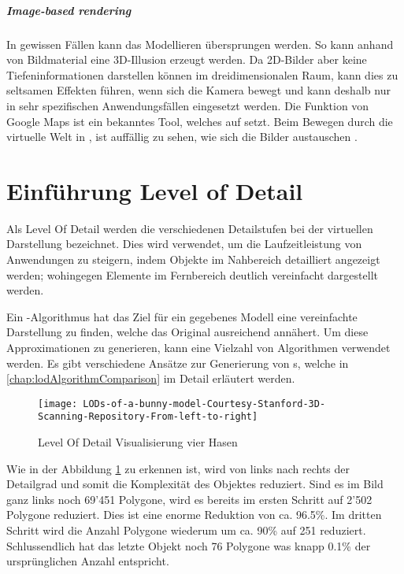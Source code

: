 \subparagraph{Image-based rendering}
In gewissen Fällen kann das Modellieren übersprungen werden. So kann anhand von Bildmaterial eine 3D-Illusion erzeugt werden. Da 2D-Bilder aber keine Tiefeninformationen darstellen können im dreidimensionalen Raum, kann dies zu seltsamen Effekten führen, wenn sich die Kamera bewegt und kann deshalb nur in sehr spezifischen Anwendungsfällen eingesetzt werden. Die  Funktion von Google Maps ist ein bekanntes Tool, welches auf  setzt.
Beim Bewegen durch die virtuelle Welt in , ist auffällig zu sehen, wie sich die Bilder austauschen \cite{imageBasedRendering}.

\section{Einführung Level of Detail}
\label{chap:lodIntroduction}
Als Level Of Detail werden die verschiedenen Detailstufen bei der virtuellen Darstellung bezeichnet.
Dies wird verwendet, um die Laufzeitleistung von Anwendungen zu steigern, indem Objekte im Nahbereich detailliert angezeigt werden; wohingegen Elemente im Fernbereich deutlich vereinfacht dargestellt werden.

Ein -Algorithmus hat das Ziel für ein gegebenes Modell eine vereinfachte Darstellung zu finden, welche das Original ausreichend annähert. Um diese Approximationen zu generieren, kann eine Vielzahl von Algorithmen verwendet werden. Es gibt verschiedene Ansätze zur Generierung von s, welche in \autoref{chap:lodAlgorithmComparison} im Detail erläutert werden.

\begin{figure}[H]
\centering
\texttt{[image: LODs-of-a-bunny-model-Courtesy-Stanford-3D-Scanning-Repository-From-left-to-right]}
\caption{Level Of Detail Visualisierung vier Hasen \cite{stanfordBunnyModel}}
\label{fig:LevelOfDetailVisualisierungvierHasen}
\end{figure}

Wie in der Abbildung \ref{fig:LevelOfDetailVisualisierungvierHasen} zu erkennen ist, wird von links nach rechts der Detailgrad und somit die Komplexität des Objektes reduziert. Sind es im Bild ganz links noch 69'451 Polygone, wird es bereits im ersten Schritt auf 2'502 Polygone reduziert. Dies ist eine enorme Reduktion von ca. 96.5\%. Im dritten Schritt wird die Anzahl Polygone wiederum um ca. 90\% auf 251 reduziert. Schlussendlich hat das letzte Objekt noch 76 Polygone was knapp 0.1\% der ursprünglichen Anzahl entspricht.

